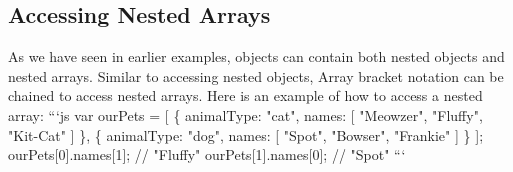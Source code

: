 \documentclass{article}%
\begin{document}
\subsection{Accessing Nested Arrays}%
\label{subsec:AccessingNestedArrays}%
As we have seen in earlier examples, objects can contain both nested objects and nested arrays. Similar to accessing nested objects, Array bracket notation can be chained to access nested arrays.\newline%
Here is an example of how to access a nested array:\newline%
```js\newline%
var ourPets = {[}\newline%
  \{\newline%
    animalType: "cat",\newline%
    names: {[}\newline%
      "Meowzer",\newline%
      "Fluffy",\newline%
      "Kit{-}Cat"\newline%
    {]}\newline%
  \},\newline%
  \{\newline%
    animalType: "dog",\newline%
    names: {[}\newline%
      "Spot",\newline%
      "Bowser",\newline%
      "Frankie"\newline%
    {]}\newline%
  \}\newline%
{]};\newline%
ourPets{[}0{]}.names{[}1{]}; // "Fluffy"\newline%
ourPets{[}1{]}.names{[}0{]}; // "Spot"\newline%
```\newline%

%
\end{document}
